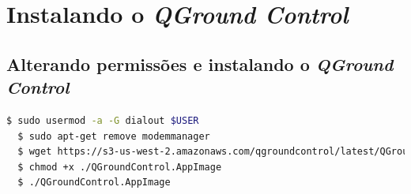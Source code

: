 \documentclass[12pt,a4paper,oneside]{book}
\begin{document}
\section{Instalando o \textit{QGround Control}}

\subsection{Alterando permissões e instalando o \textit{QGround Control}}
\begin{lstlisting}[language=bash] 
  $ sudo usermod -a -G dialout $USER
  $ sudo apt-get remove modemmanager
  $ wget https://s3-us-west-2.amazonaws.com/qgroundcontrol/latest/QGroundControl.AppImage
  $ chmod +x ./QGroundControl.AppImage 
  $ ./QGroundControl.AppImage
\end{lstlisting}
%
%
\end{document}
